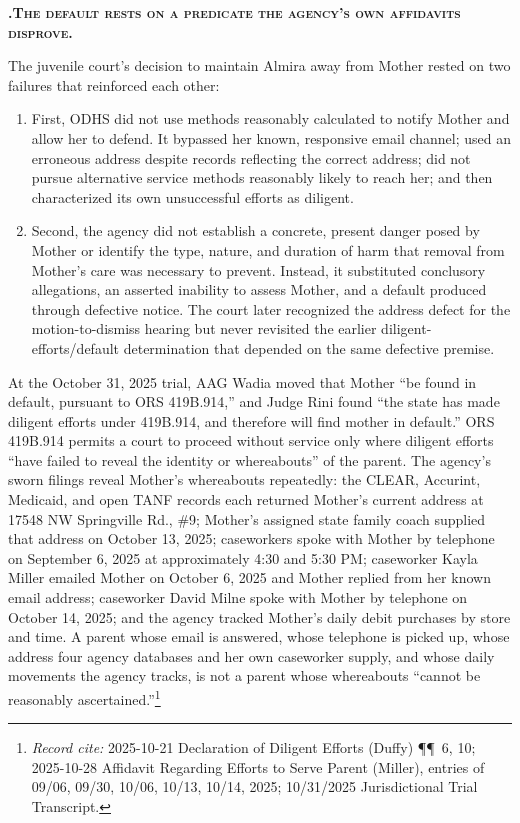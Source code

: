 \documentclass[10pt,a4paper,roman]{moderncv}
\newcounter{legalsection}
\newcounter{legalsubsection}[legalsection]
\renewcommand{\thelegalsubsection}{\Alph{legalsubsection}}
\newcommand{\legalsubsection}[1]{%
	\refstepcounter{legalsubsection}%
	\par\addvspace{0.85em}%
	{\color{inkblue}\normalfont\normalsize\bfseries\scshape
		\thelegalsubsection.\hspace{0.45em}#1\par}%
	\vspace{0.2em}%
}
\begin{document}
\begin{enumerate}[leftmargin=*,itemsep=0.35em,topsep=0.3em,resume]
\legalsubsection{The default rests on a predicate the agency's own affidavits disprove.}
The juvenile court's decision to maintain Almira away from Mother rested on two failures that reinforced each other:
\begin{enumerate}[label=\roman*., leftmargin=.55in]
	\item First, ODHS did not use methods reasonably calculated to notify Mother and allow her to defend. It bypassed her known, responsive email channel; used an erroneous address despite records reflecting the correct address; did not pursue alternative service methods reasonably likely to reach her; and then characterized its own unsuccessful efforts as diligent.
	\item Second, the agency did not establish a concrete, present danger posed by Mother or identify the type, nature, and duration of harm that removal from Mother's care was necessary to prevent. Instead, it substituted conclusory allegations, an asserted inability to assess Mother, and a default produced through defective notice. The court later recognized the address defect for the motion-to-dismiss hearing but never revisited the earlier diligent-efforts/default determination that depended on the same defective premise.
\end{enumerate}

At the October 31, 2025 trial, AAG Wadia moved that Mother ``be found in default, pursuant to ORS 419B.914,'' and Judge Rini found ``the state has made diligent efforts under 419B.914, and therefore will find mother in default.'' ORS 419B.914 permits a court to proceed without service only where diligent efforts ``have failed to reveal the identity or whereabouts'' of the parent. The agency's sworn filings reveal Mother's whereabouts repeatedly: the CLEAR, Accurint, Medicaid, and open TANF records each returned Mother's current address at 17548 NW Springville Rd., \#9; Mother's assigned state family coach supplied that address on October 13, 2025; caseworkers spoke with Mother by telephone on September 6, 2025 at approximately 4:30 and 5:30 PM; caseworker Kayla Miller emailed Mother on October 6, 2025 and Mother replied from her known email address; caseworker David Milne spoke with Mother by telephone on October 14, 2025; and the agency tracked Mother's daily debit purchases by store and time. A parent whose email is answered, whose telephone is picked up, whose address four agency databases and her own caseworker supply, and whose daily movements the agency tracks, is not a parent whose whereabouts ``cannot be reasonably ascertained.''\footnote{\textit{Record cite:} 2025-10-21 Declaration of Diligent Efforts (Duffy) \P\P~6, 10; 2025-10-28 Affidavit Regarding Efforts to Serve Parent (Miller), entries of 09/06, 09/30, 10/06, 10/13, 10/14, 2025; 10/31/2025 Jurisdictional Trial Transcript.}


\end{enumerate}
\end{document}
